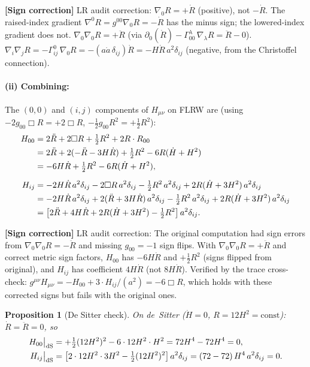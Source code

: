\documentclass[12pt,a4paper]{article}
\newtheorem{proposition}{Proposition}[section]
\theoremstyle{definition}
\theoremstyle{remark}
\newcommand{\signcorrection}[1]{%
  \par\noindent\colorbox{red!10}{%
    \parbox{\dimexpr\linewidth-2\fboxsep}{%
      \textcolor{red!50!black}{\textbf{[Sign correction]}}
      \textcolor{red!50!black}{#1}%
    }%
  }\par%
}
\begin{document}
\signcorrection{LR audit correction:
$\nabla_0 R = +\dot{R}$ (positive), not $-\dot{R}$.
The raised-index gradient $\nabla^0 R = g^{00}\nabla_0 R = -\dot{R}$
has the minus sign; the lowered-index gradient does not.
$\nabla_0\nabla_0 R = +\ddot{R}$ (via
$\partial_0(\dot{R}) - \Gamma^\lambda_{00}\,\nabla_\lambda R
= \ddot{R} - 0$).
$\nabla_i\nabla_j R = -\Gamma^0_{ij}\,\nabla_0 R
= -(a\dot{a}\,\delta_{ij})\dot{R} = -H\dot{R}\,a^2\delta_{ij}$
(negative, from the Christoffel connection).}

\paragraph{(ii) Combining:} The $(0,0)$ and $(i,j)$ components of
$H_{\mu\nu}$ on FLRW are (using
$-2g_{00}\Box R = +2\Box R$,
$-\tfrac{1}{2}g_{00}R^2 = +\tfrac{1}{2}R^2$):
\begin{align}
  H_{00} &= 2\ddot{R} + 2\Box R + \tfrac{1}{2}R^2
  + 2R\cdot R_{00} \notag\\
  &= 2\ddot{R} + 2(-\ddot{R} - 3H\dot{R}) + \tfrac{1}{2}R^2
  - 6R(\dot{H} + H^2) \notag\\
  &= -6H\dot{R} + \tfrac{1}{2}R^2
  - 6R(\dot{H} + H^2),
  \label{eq:H00}\\[6pt]
  H_{ij} &= -2H\dot{R}\,a^2\delta_{ij}
  - 2\Box R\,a^2\delta_{ij}
  - \tfrac{1}{2}R^2\,a^2\delta_{ij}
  + 2R(\dot{H} + 3H^2)\,a^2\delta_{ij} \notag\\
  &= -2H\dot{R}\,a^2\delta_{ij}
  + 2(\ddot{R} + 3H\dot{R})\,a^2\delta_{ij}
  - \tfrac{1}{2}R^2\,a^2\delta_{ij}
  + 2R(\dot{H} + 3H^2)\,a^2\delta_{ij} \notag\\
  &= \bigl[2\ddot{R} + 4H\dot{R} + 2R(\dot{H} + 3H^2)
  - \tfrac{1}{2}R^2\bigr]\,a^2\delta_{ij}.
  \label{eq:Hij}
\end{align}

\signcorrection{LR audit correction: The original computation had
sign errors from $\nabla_0\nabla_0 R = -\ddot{R}$ and missing
$g_{00} = -1$ sign flips. With $\nabla_0\nabla_0 R = +\ddot{R}$
and correct metric sign factors, $H_{00}$ has $-6H\dot{R}$ and
$+\tfrac{1}{2}R^2$ (signs flipped from original), and $H_{ij}$ has
coefficient $4H\dot{R}$ (not $8H\dot{R}$). Verified by the trace
cross-check: $g^{\mu\nu}H_{\mu\nu} = -H_{00} + 3\cdot H_{ij}/(a^2)
= -6\Box R$, which holds with these corrected signs but fails with
the original ones.}

\begin{proposition}[De Sitter check]\label{prop:H-dS}
On de~Sitter ($\dot{H} = 0$, $R = 12H^2 = \mathrm{const}$):
$\dot{R} = \ddot{R} = 0$, so
\begin{align}
  H_{00}\big|_{\mathrm{dS}} &= +\tfrac{1}{2}(12H^2)^2
  - 6\cdot 12H^2\cdot H^2 = 72H^4 - 72H^4
  = 0, \notag\\
  H_{ij}\big|_{\mathrm{dS}} &= \bigl[2\cdot 12H^2 \cdot 3H^2
  - \tfrac{1}{2}(12H^2)^2\bigr]\,a^2\delta_{ij}
  = (72 - 72)\,H^4\,a^2\delta_{ij} = 0. \notag
\end{align}
\end{proposition}
\end{document}
